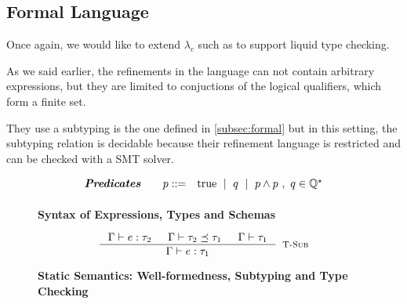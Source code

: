 \subsection{Formal Language}
Once again, we would like to extend $\lambda_c$ such as to support liquid type checking.

As we said earlier, the refinements in the language 
can not contain arbitrary expressions, but they are limited
to conjuctions of the logical qualifiers, which form a finite set.

They use a subtyping is the one defined in \ref{subsec:formal} 
but in this setting,  
the subtyping relation is decidable
because their refinement language is restricted
and can be checked with a SMT solver.

\begin{figure}[t!]
\centering
$$
\begin{array}{rrcl}
\textbf{\emph{Predicates}} \quad
  & p ::=
  & 	\text{true}
  \ \mid \  q
  \ \mid \  p \land p \ , \ q \in \mathbb{Q^\star}
  \\[0.05in] 
\end{array}
$$
\caption{\textbf{Syntax of Expressions, Types and Schemas}}
\label{fig:syntax}
\end{figure}


\begin{figure}[ht!]
\medskip {}

$$\begin{array}{cc}

\inference
  {  \hastype{\Gamma}{e}{\tau_2} && \isSubType{\Gamma}{\tau_2}{\tau_1} 
  && \isWellFormed{\Gamma}{\tau_1}
  }
  {\hastype{\Gamma}{e}{\tau_1}}
  [\tsub]
\end{array}$$

\caption{\textbf{Static Semantics: Well-formedness, Subtyping and Type Checking}}
\label{fig:rules}
\end{figure}